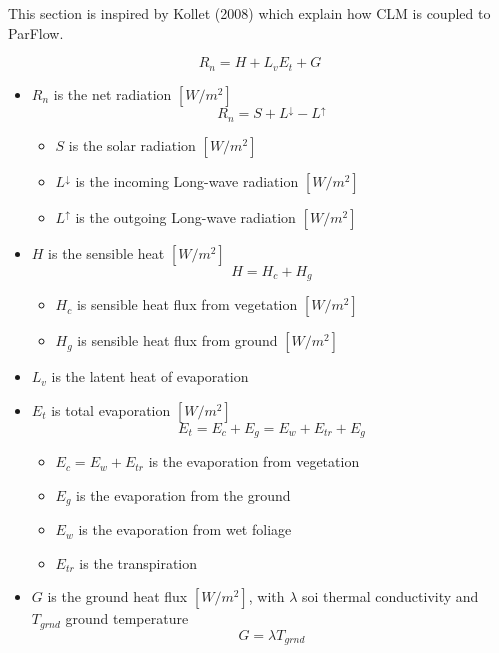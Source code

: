 \documentclass[11pt,a4paper]{report}
\begin{document}
This section is inspired by Kollet (2008) which explain how CLM is coupled to ParFlow.

\begin{equation}
R_n=H+L_vE_t+G
\end{equation}
\begin{itemize}
	\item $R_n$ is the net radiation $[W/m^2]$
	\begin{equation}
	R_n=S+L^{\downarrow}-L^{\uparrow}
	\end{equation}
	\begin{itemize}
		\item $S$ is the solar radiation $[W/m^2]$
		\item $L^{\downarrow}$ is the incoming Long-wave radiation $[W/m^2]$
		\item $L^{\uparrow}$ is the outgoing Long-wave radiation $[W/m^2]$
	\end{itemize}
	\item $H$ is the sensible heat $[W/m^2]$
	\begin{equation}
	H=H_c+H_g
	\end{equation}
	\begin{itemize}
		\item $H_c$ is sensible heat flux from vegetation $[W/m^2]$
		\item $H_g$ is sensible heat flux from ground $[W/m^2]$
	\end{itemize}
	\item $L_v$ is the latent heat of evaporation
	\item $E_t$ is total evaporation $[W/m^2]$
	\begin{equation}
	E_t=E_c+E_g=E_w+E_{tr}+E_g
	\end{equation}
	\begin{itemize}
		\item $E_c=E_w+E_{tr}$ is the evaporation from vegetation
		\item $E_g$ is the evaporation from the ground
		\item $E_w$  is the evaporation from wet foliage
		\item $E_{tr}$  is the transpiration
	\end{itemize}
	\item $G$ is the ground heat flux $[W/m^2]$, with $\lambda$ soi thermal conductivity and $T_{grnd}$ ground temperature
	\begin{equation}
	G=\lambda T_{grnd}
	\end{equation}
\end{itemize}
\end{document}

